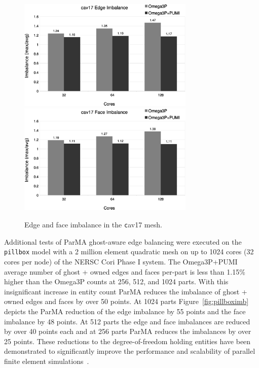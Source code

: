 \documentclass[review,12pt]{elsarticle_summary_report}
\begin{document}
\begin{figure}[!ph]
\centering
  \includegraphics[width=0.75\textwidth]{cav17-edge-imb.eps} \\
  \includegraphics[width=0.75\textwidth]{cav17-face-imb.eps} 
  \caption{\label{fig:cav17imb} Edge and face imbalance in the {\texttt cav17} mesh.}
\end{figure}

Additional tests of ParMA ghost-aware edge balancing were executed on the
\texttt{pillbox} model with a 2 million element quadratic mesh on up to 1024
cores (32 cores per node) of the NERSC Cori Phase I system.
The Omega3P+PUMI average number of ghost + owned edges and faces per-part
is less than 1.15\% higher than the Omega3P counts at 256, 512, and 1024 parts.
With this insignificant increase in entity count ParMA reduces the imbalance of 
ghost + owned edges and faces by over 50 points.
At 1024 parts Figure~\ref{fig:pillboximb} depicts the ParMA reduction of the
edge imbalance by 55 points and the face imbalance by 48 points.
At 512 parts the edge and face imbalances are reduced by over 40 points each and
at 256 parts ParMA reduces the imbalances by over 25 points.
These reductions to the degree-of-freedom holding entities have been
demonstrated to significantly improve the performance and scalability of
parallel finite element simulations~\cite{zhou2012unstructured}.
\end{document}
